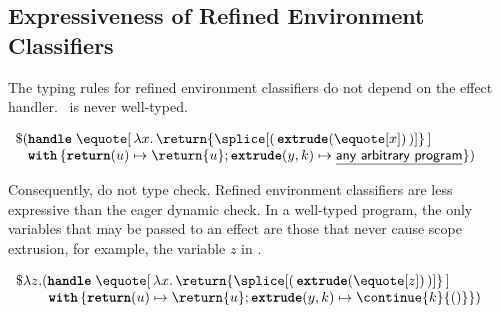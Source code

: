 
\subsection{Expressiveness of Refined Environment Classifiers}\label{subsection:rec-formal-expressiveness}
The typing rules for refined environment classifiers do not depend on the effect handler.\  is never well-typed.

\begin{code}
\begin{rec}
$\begin{array}{l}
  \$ (\textbf{\texttt{handle}} \; \equote[\, {\lambda x. \, \return{\splice[(\, {{\textbf{\texttt{extrude}}(\equote[x])}} \, )]}} \, ] \\
  \;\;\,\, \textbf{\texttt{with}} \, \{ \textbf{\texttt{return}}(u) \mapsto {\return{u}}; \textbf{\texttt{extrude}}(y, k) \mapsto {\underline{\textsf{any arbitrary program}}}\})
\end{array}$
\end{rec}
%
\label{listing:refined-environment-classifiers-expressiveness}
\end{code}

Consequently,  do not type check. Refined environment classifiers are less expressive than the eager dynamic check. In a well-typed \recLang{} program, the only variables that may be passed to an effect are those that never cause scope extrusion, for example, the variable $z$ in .

\begin{code}
\begin{rec}
$\begin{array}{l}
  \$ \lambda z. (\textbf{\texttt{handle}} \; \equote[\, {\lambda x. \, \return{\splice[( \, {{\textbf{\texttt{extrude}}(\equote[z])}} \, )]}} \,] \\
  \quad \quad \,\, \textbf{\texttt{with}} \, \{ \textbf{\texttt{return}}(u) \mapsto {\return{u}}; \textbf{\texttt{extrude}}(y, k) \mapsto {\continue{k}{()}}\})
\end{array}$
\end{rec}
%
\label{listing:refined-environment-classifiers-safe}
\end{code}


